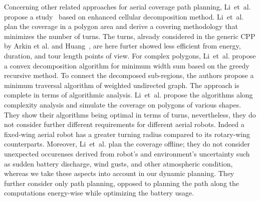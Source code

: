 Concerning other related approaches for aerial coverage path planning, Li~et~al. propose a study~\citep{li2011coverage} based on enhanced cellular decomposition method. Li~et~al. plan the coverage in a polygon area and derive a covering methodology that minimizes the number of turns. The turns, already considered in the generic CPP by Arkin et al. and Huang~\citep{arkin2001optimal,arkin2005optimal,huang2001optimal}, are here furter showed less efficient from energy, duration, and tour length points of view. For complex polygons, Li~et~al. propose a convex decomposition algorithm for minimum width sum based on the greedy recursive method. To connect the decomposed sub-regions, the authors propose a minimum traversal algorithm of weighted undirected graph. The approach is complete in terms of algorithmic analysis. Li~et~al. propose the algorithms along complexity analysis and simulate the coverage on polygons of various shapes. They show their algorithms being optimal in terms of turns, nevertheless, they do not consider further different requirements for different aerial robots. Indeed a fixed-wing aerial robot has a greater turning radius compared to its rotary-wing counterparts. Moreover, Li~et~al. plan the coverage offline; they do not consider unexpected occurenses derived from robot's and environment's uncertainty such as sudden battery discharge, wind gusts, and other atmospheric condition, whereas we take these aspects into account in our dynamic planning. They further consider only path planning, opposed to planning the path along the computations energy-wise while optimizing the battery usage. 

